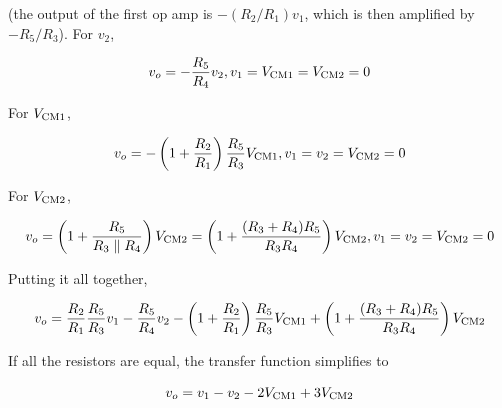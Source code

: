 (the output of the first op amp is $-(R_2/R_1)v_1$, which is then amplified by $-R_5/R_3$).
For $v_2$,

\begin{equation}
\vout = -\frac{R_5}{R_4}v_2, v_1 = V\sub{CM1} = V\sub{CM2} = 0
\end{equation}

For $V_\mathrm{CM1}$,

\begin{equation}
\vout = -\left(1+\frac{R_2}{R_1}\right)\frac{R_5}{R_3}V\sub{CM1}, v_{1} = v_{2} = V\sub{CM2} = 0
\end{equation}

For $V_\mathrm{CM2}$,

\begin{equation}
\vout = \left(1+\frac{R_5}{R_3 \parallel R_4}\right)V\sub{CM2} = \left(1+\frac{(R_3+R_4)R_5}{R_3R_4}\right)V\sub{CM2}, v_1 = v_2 = V\sub{CM2} = 0
\end{equation}

Putting it all together,

\textcolor{red}{
\begin{equation}
\vout = \frac{R_2}{R_1}\frac{R_5}{R_3}v_1 - \frac{R_5}{R_4}v_2 - \left(1+\frac{R_2}{R_1}\right)\frac{R_5}{R_3}V\sub{CM1} + \left(1+\frac{(R_3+R_4)R_5}{R_3R_4}\right)V\sub{CM2}
\label{eq:highcmdifferenceamplifier}
\end{equation}
}

If all the resistors are equal, the transfer function simplifies to

\textcolor{red}{
\begin{equation}
\vout = v_1-v_2-2V\sub{CM1}+3V\sub{CM2}
\label{eq:highcmdifferenceamplifier_simple}
\end{equation}
}

